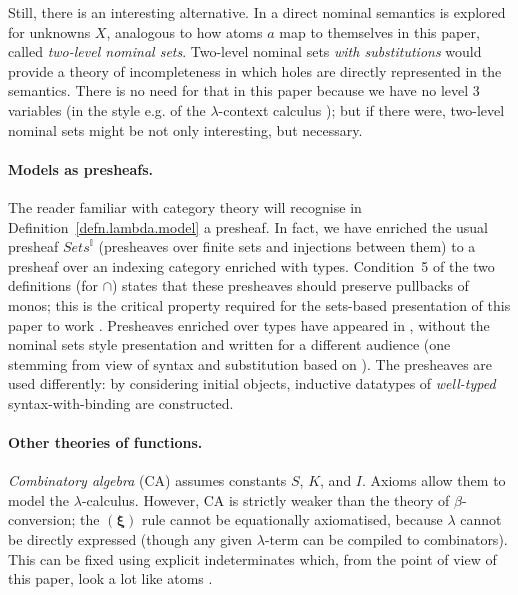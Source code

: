 \documentclass[submission,copyright]{eptcs}
\newcommand{\f}[1]{\ensuremath{\text{$\mathit{#1}$}}}
\newcommand{\rulefont}[1]{\ensuremath{(\mathbf{#1})}}
\begin{document}
Still, there is an interesting alternative.
In \cite{gabbay:twolns} a direct nominal semantics is explored for unknowns $X$, analogous to how atoms $a$ map to themselves in this paper, called \emph{two-level nominal sets}.
Two-level nominal sets \emph{with substitutions} would provide a theory of incompleteness in which holes are directly represented in the semantics.
There is no need for that in this paper because we have no level 3 variables (in the style e.g. of the $\lambda$-context calculus \cite{gabbay:lamcce}); but if there were, two-level nominal sets might be not only interesting, but necessary. 

\paragraph{Models as presheafs.}
The reader familiar with category theory will recognise in Definition~\ref{defn.lambda.model} a presheaf.
In fact, we have enriched the usual presheaf $\f{Sets}^{\mathbb I}$ (presheaves over finite sets and injections between them) to a presheaf over an indexing category enriched with types.
Condition~5 of the two definitions (for $\cap$) states that these presheaves should preserve pullbacks of monos; this is the critical property required for the sets-based presentation of this paper to work \cite{gabbay:nomrs}.
Presheaves enriched over types have appeared in \cite{zsido:typas}, without the nominal sets style presentation and written for a different audience (one stemming from view of syntax and substitution based on \cite{fiore:abssvb}).
The presheaves are used differently: by considering initial objects, inductive datatypes of \emph{well-typed} syntax-with-binding are constructed.

\paragraph{Other theories of functions.}
\emph{Combinatory algebra} (CA) assumes constants $S$, $K$, and $I$.  Axioms allow them to model the $\lambda$-calculus.
However, CA is strictly weaker than the theory of $\beta$-conversion; the \rulefont{\xi} rule cannot be equationally axiomatised, because $\lambda$ cannot be directly expressed (though any given $\lambda$-term can be compiled to combinators).
This can be fixed using explicit indeterminates which, from the point of view of this paper, look a lot like atoms \cite{selinger:lamca}.
\end{document}
